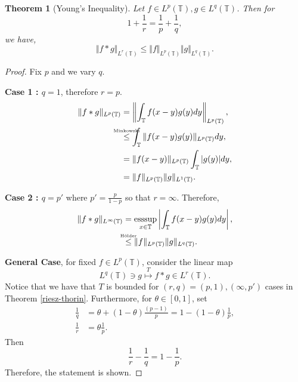 \documentclass[8pt]{article}
\newtheorem{theorem}{Theorem} [section]
\DeclareMathOperator{\esssup}{esssup}
\newcommand{\ztext}[1]{\text{\makebox[0pt][c]{\tiny #1}}}
\newcommand{\norm}[1]{\Vert #1 \Vert}
\newcommand{\ab}[1]{\vert #1 \vert}
\newcommand{\bT}[0]{\mathbb{T}}
\begin{document}
\begin{theorem}[Young's Inequality]
  \label{theorem_young_inequality}
  Let $f\in L^p(\bT),g\in L^q(\bT)$. Then for 
  \begin{equation*}
    1+{\frac 1 r} = {\frac 1 p}+{\frac 1 q},
  \end{equation*}
  we have,
  \begin{equation*}
    \norm{f\ast g}_{L^r(\bT)}\leq \norm{f}_{L^p(\bT)}\norm{g}_{L^q(\bT)}.
  \end{equation*}
\end{theorem}

\begin{proof}
  Fix $p$ and we vary $q$. 
  \par\textbf{Case 1 : $q=1$}, therefore $r=p$. 
  \begin{align*}
    \norm{f\ast g}_{L^p(\bT)} & = \left\Vert\int_\bT f(x-y)g(y)dy\right\Vert_{L^p(\bT)},\\
    & \stackrel{\ztext{Minkowski}}{\leq} \int_\bT\norm{f(x-y)g(y)}_{L^p(\bT)}dy,\\
    & = \norm{f(x-y)}_{L^p(\bT)}\int_\bT\ab{g(y)}dy,\\
    & = \norm{f}_{L^p(\bT)}\norm{g}_{L^1(\bT)}.
  \end{align*}
  \par\textbf{Case 2 : $q=p'$} where $p' = {\frac {p} {1-p}}$ so that $r=\infty$. Therefore,
  \begin{align*}
    \norm{f\ast g}_{L^\infty(\bT)}&=\esssup_{x\in\bT}\left\vert\int_{\bT}f(x-y)g(y)dy\right\vert,\\
    & \stackrel{\ztext{Hölder}}{\leq}\norm{f}_{L^p(\bT)}\norm{g}_{L^q(\bT)}.
  \end{align*}
  \par\textbf{General Case}, for fixed $f\in L^p(\bT)$, consider the linear map 
  \begin{equation*}
    L^q(\bT)\ni g\stackrel{T}{\mapsto} f\ast g\in L^r(\bT).
  \end{equation*}
  Notice that we have that $T$ is bounded for $(r,q) = (p,1),(\infty,p')$ cases in Theorem \ref{riesz-thorin}. Furthermore, for $\theta\in[0,1]$, set
  \begin{align*}
    {\frac 1 q} & = \theta + (1-\theta){\frac{(p-1)}{p}} = 1-(1-\theta){\frac 1 p},\\
    {\frac 1 r} & = \theta {\frac 1 p}.
  \end{align*}
  Then 
  \begin{equation*}
    {\frac 1 r}-{\frac 1 q} = 1-{\frac 1 p}.
  \end{equation*}
  Therefore, the statement is shown.
\end{proof}
\end{document}
